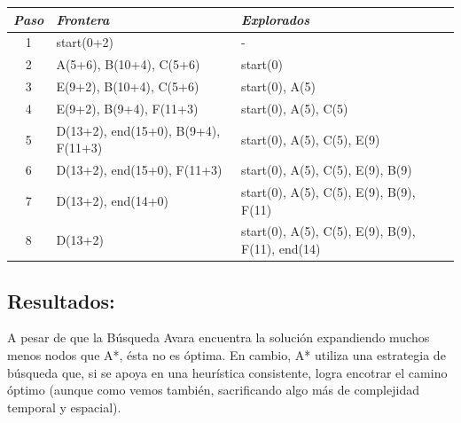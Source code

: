 \documentclass{article}
\begin{document}
\resizebox{\textwidth}{!} {
    \begin{tabular}{c|l|l}
    \hline
    \textit{Paso} & \textit{Frontera}          & \textit{Explorados}                              \\ \hline
    1    & start(0+2)                          & -                                                \\ \hline
    2    & A(5+6), B(10+4), C(5+6)             & start(0)                                         \\ \hline
    3    & E(9+2), B(10+4), C(5+6)             & start(0), A(5)                                   \\ \hline
    4    & E(9+2), B(9+4), F(11+3)             & start(0), A(5), C(5)                             \\ \hline
    5    & D(13+2), end(15+0), B(9+4), F(11+3) & start(0), A(5), C(5), E(9)                       \\ \hline
    6    & D(13+2), end(15+0), F(11+3)         & start(0), A(5), C(5), E(9), B(9)                 \\ \hline
    7    & D(13+2), end(14+0)                  & start(0), A(5), C(5), E(9), B(9), F(11)          \\ \hline
    8    & D(13+2)                             & start(0), A(5), C(5), E(9), B(9), F(11), end(14) \\ \hline
    \end{tabular}
}

\bigskip\bigskip
\subsection{Resultados:}
A pesar de que la Búsqueda Avara encuentra la solución expandiendo muchos menos nodos que A*, ésta no es óptima. En cambio,
A* utiliza una estrategia de búsqueda que, si se apoya en una heurística consistente, logra encotrar el camino óptimo (aunque como
vemos también, sacrificando algo más de complejidad temporal y espacial).
\newpage
\end{document}
